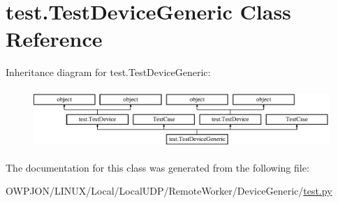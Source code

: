 \hypertarget{classtest_1_1TestDeviceGeneric}{\section{test.\-Test\-Device\-Generic Class Reference}
\label{classtest_1_1TestDeviceGeneric}
}
Inheritance diagram for test.\-Test\-Device\-Generic\-:\begin{figure}[H]
\begin{center}
\leavevmode
\includegraphics[height=2.225166cm]{classtest_1_1TestDeviceGeneric}
\end{center}
\end{figure}


The documentation for this class was generated from the following file\-:\begin{DoxyCompactItemize}
\item 
O\-W\-P\-J\-O\-N/\-L\-I\-N\-U\-X/\-Local/\-Local\-U\-D\-P/\-Remote\-Worker/\-Device\-Generic/\hyperlink{LINUX_2Local_2LocalUDP_2RemoteWorker_2DeviceGeneric_2test_8py}{test.\-py}\end{DoxyCompactItemize}
